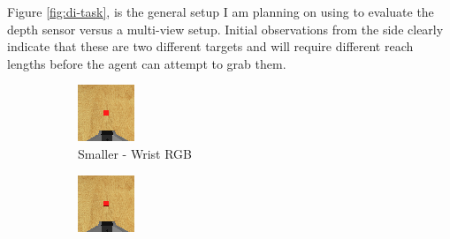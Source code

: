 Figure \ref{fig:di-task}, is the general setup I am planning on using to evaluate the depth sensor versus a multi-view setup. Initial observations from the side clearly indicate that these are two different targets and will require different reach lengths before the agent can attempt to grab them.

\begin{figure}[htpb] %
  \centering
  \begin{subfigure}{0.4\linewidth}
    \centering
    \includegraphics[width=0.7\linewidth]{assets/depth-interfacing/normal-size-wrist.png}
    \caption{Smaller - Wrist RGB}\label{subfig:normal-rgb}
  \end{subfigure}
  \begin{subfigure}{0.4\linewidth}
    \centering
    \includegraphics[width=0.7\linewidth]{assets/depth-interfacing/smaller-wrist.png}

\end{subfigure}
\end{figure}
